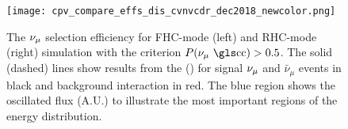 \begin{figure}
    \centering
		\texttt{[image: cpv\_compare\_effs\_dis\_cvnvcdr\_dec2018\_newcolor.png]} 
	\caption{The $\nu_\mu$  selection efficiency for FHC-mode (left) and RHC-mode (right) simulation with the criterion $P(\numu \textrm{ \dword{cc}}) > 0.5$. The solid (dashed) lines show results from the  () for signal $\nu_\mu$  and $\bar{\nu}_\mu$  events in black and  background interaction in red. The blue region shows the oscillated flux (A.U.) to illustrate the most important regions of the energy distribution.}
    \label{fig:numueff}
\end{figure}



